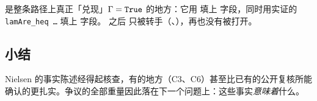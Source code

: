 
 是整条路径上真正「兑现」$\Gamma = \text{\texttt{True}}$ 的地方：它用  填上  字段，同时用实证的 \texttt{lamAre\_heq …} 填上  字段。
之后  只被转手（、），再也没有被打开。

\subsection{小结}

Nielsen 的事实陈述经得起核查，有的地方（C3、C6）甚至比已有的公开复核所能确认的更扎实。争议的全部重量因此落在下一个问题上：这些事实\emph{意味着}什么。
